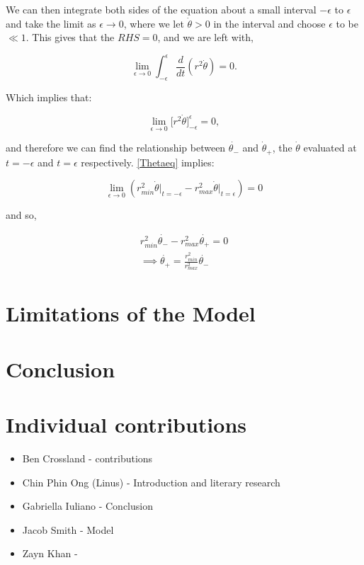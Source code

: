 \documentclass[12pt]{article}
\begin{document}
We can then integrate both sides of the equation about a small interval $-\epsilon$ to $\epsilon$ and take the limit as $\epsilon \to 0$, where we let $\dot{\theta} > 0$ in the interval and choose $\epsilon$ to be $\ll 1$. This gives that the $RHS = 0$,
and we are left with,

$$\lim_{\epsilon \to 0} \int_{-\epsilon} ^ \epsilon \frac{d}{dt}(r^2 \dot{\theta}) = 0.$$

Which implies that:

\begin{equation}
\lim_{\epsilon \to 0}\big[r^2 \dot{\theta}\big]^\epsilon_{-\epsilon} = 0,\label{Thetaeq}
\end{equation}

and therefore we can find the relationship between $\dot{\theta_-}$ and $\dot{\theta}_+$, the $\dot{\theta}$ evaluated at $t=-\epsilon$ and $t = \epsilon$ respectively. \ref{Thetaeq} implies:

$$\lim_{\epsilon \to 0}(r^2_{min} \dot{\theta} \big|_{t= -\epsilon} - r^2_{max} \dot{\theta} \big|_{t=\epsilon}) = 0$$

and so,

\begin{align}
    r^2_{min} \dot{\theta_-} - r^2_{max} \dot{\theta_+} = 0\\
    \implies \dot{\theta_+} = \frac{r^2_{min}}{r^2_{max}}\dot{\theta_-}
\end{align}




\section{Limitations of the Model}

\section{Conclusion}


\section{Individual contributions}
\begin{itemize}
    \item Ben Crossland - contributions
    \item Chin Phin Ong (Linus) - Introduction and literary research
    \item Gabriella Iuliano - Conclusion
    \item Jacob Smith - Model
    \item Zayn Khan -
\end{itemize}

\newpage


\end{document}
